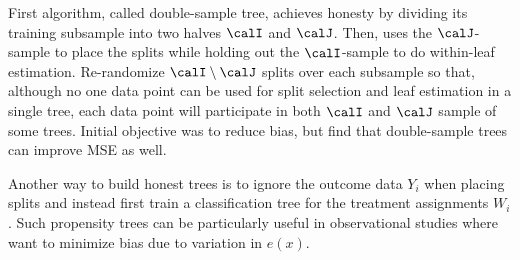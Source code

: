 First algorithm, called double-sample tree, achieves honesty by dividing its training subsample into two halves $\calI$ and $\calJ$. Then, uses the $\calJ$-sample to place the splits while holding out the $\calI$-sample to do within-leaf estimation. Re-randomize $\calI\setminus\calJ$ splits over each subsample so that, although no one data point can be used for split selection and leaf estimation in a single tree, each data point will participate in both $\calI$ and $\calJ$ sample of some trees. Initial objective was to reduce bias, but find that double-sample trees can improve MSE as well.

Another way to build honest trees is to ignore the outcome data $Y_i$ when placing splits and instead first train a classification tree for the treatment assignments $W_i$. Such propensity trees can be particularly useful in observational studies where want to minimize bias due to variation in $e(x)$.










